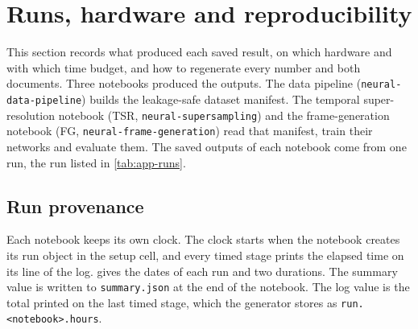 
\section{Runs, hardware and reproducibility}\label{sec:app}

This section records what produced each saved result, on which hardware and with which time budget, and how to regenerate every number and both documents. Three notebooks produced the outputs. The data pipeline (\texttt{neural-data-pipeline}) builds the leakage-safe dataset manifest. The temporal super-resolution notebook (TSR, \texttt{neural-supersampling}) and the frame-generation notebook (FG, \texttt{neural-frame-generation}) read that manifest, train their networks and evaluate them. The saved outputs of each notebook come from one run, the run listed in \cref{tab:app-runs}.

\subsection{Run provenance}\label{sec:app-prov}

Each notebook keeps its own clock. The clock starts when the notebook creates its run object in the setup cell, and every timed stage prints the elapsed time on its line of the log.  gives the dates of each run and two durations. The summary value is written to \texttt{summary.json} at the end of the notebook. The log value is the total printed on the last timed stage, which the generator stores as \texttt{run.<notebook>.hours}.

